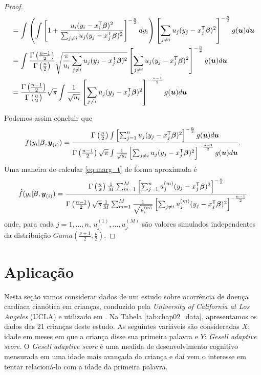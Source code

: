 \begin{proof}
\begin{equation*}
\begin{split}
& = \int \left( \int  \left[1+\frac{u_i(y_i-x_i^{\mathsf{T}}{\boldsymbol{\beta}})^2}{\sum_{j\neq i}u_j(y_j-x_j^{\mathsf{T}}{\boldsymbol{\beta}})^2}\right]^{-\frac{n}{2}} d y_i \right) \left[\sum_{j\neq i}u_j(y_j-x_j^{\mathsf{T}}{\boldsymbol{\beta}})^2\right]^{-\frac{n}{2}} g({\boldsymbol{u}}) d{\boldsymbol{u}} \\
& = \int \frac{\Gamma\left(\frac{n-1}{2}\right)}{\Gamma\left(\frac{n}{2}\right)} \sqrt{\frac{\pi}{u_i} \sum_{j\neq i}u_j(y_j-x_j^{\mathsf{T}}{\boldsymbol{\beta}})^2}  \left[\sum_{j\neq i}u_j(y_j-x_j^{\mathsf{T}}{\boldsymbol{\beta}})^2\right]^{-\frac{n}{2}} g({\boldsymbol{u}}) d{\boldsymbol{u}} \\
& = \frac{\Gamma\left(\frac{n-1}{2}\right)}{\Gamma\left(\frac{n}{2}\right)}  \sqrt{\pi}\int \frac{1}{\sqrt{u_i}}  \left[\sum_{j\neq i}u_j(y_j-x_j^{\mathsf{T}}{\boldsymbol{\beta}})^2\right]^{-\frac{n-1}{2}} g({\boldsymbol{u}}) d{\boldsymbol{u}}
\end{split}
\end{equation*}

Podemos assim concluir que 
\begin{equation}\label{eq:marg_t}
\begin{split}
f(y_i|{\boldsymbol{\beta}},{\boldsymbol{y}_{(i)}}) = \frac{
\Gamma\left(\frac{n}{2}\right)\int \left[\sum_{j=1}^nu_j(y_j-x_j^{\mathsf{T}}{\boldsymbol{\beta}})^2\right]^{-\frac{n}{2}} g({\boldsymbol{u}}) d{\boldsymbol{u}}
}{
\Gamma\left(\frac{n-1}{2}\right)  \sqrt{\pi}\int \frac{1}{\sqrt{u_i}}  \left[\sum_{j\neq i}u_j(y_j-x_j^{\mathsf{T}}{\boldsymbol{\beta}})^2\right]^{-\frac{n-1}{2}} g({\boldsymbol{u}}) d{\boldsymbol{u}}
}
\end{split}
.
\end{equation}
Uma maneira de calcular \eqref{eq:marg_t} de forma aproximada é
\begin{equation}
\begin{split}
\hat{f}(y_i|{\boldsymbol{\beta}},{\boldsymbol{y}_{(i)}}) = \frac{
\Gamma\left(\frac{n}{2}\right)\frac{1}{M}\sum_{m=1}^M\left[\sum_{j=1}^n u_j^{(m)}(y_j-x_j^{\mathsf{T}}{\boldsymbol{\beta}})^2\right]^{-\frac{n}{2}} }{
\Gamma\left(\frac{n-1}{2}\right)\sqrt{\pi}\frac{1}{M}\sum_{m=1}^M \frac{1}{\sqrt{u_i^{(m)}}}  \left[\sum_{j\neq i}u_j^{(m)}(y_j-x_j^{\mathsf{T}}{\boldsymbol{\beta}})^2\right]^{-\frac{n-1}{2}}
}
\end{split}
\end{equation}
onde, para cada $j=1,\ldots,n$, $u_j^{(1)},\ldots,u_j^{(M)}$ são valores simulados independentes da distribuição $Gama(\frac{\nu+1}{2},\frac{\nu}{2})$.
\end{proof}

\section{Aplicação}
\label{sec:aplic}

Nesta seção vamos considerar dados de um estudo sobre ocorrência de doença cardíaca cianótica em crianças, conduzido pela \textit{University of California at Los Angeles} (UCLA) e utilizado em \citet{WeissCho1998}. Na Tabela \ref{tab:chap02_data}, apresentamos os dados das 21 crianças deste estudo. As seguintes variáveis são consideradas $X$: idade em meses em que a criança disse sua primeira palavra e $Y$: \textit{Gesell adaptive score}. O \textit{Gesell adaptive score} é uma medida de desenvolvimento cognitivo mensurada em uma idade mais avançada da criança e daí vem o interesse em tentar relacioná-lo com a idade da primeira palavra.

